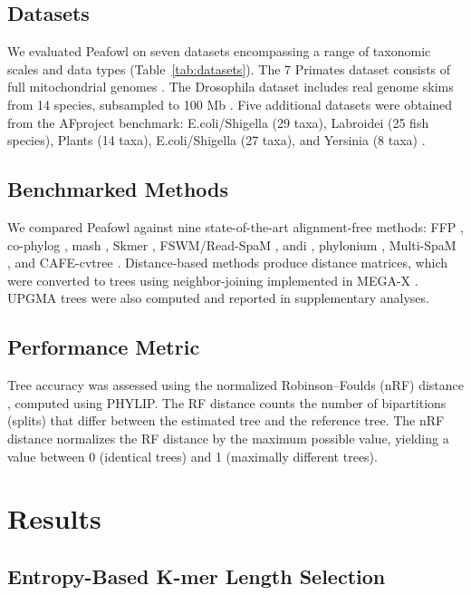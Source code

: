\documentclass[12pt]{article}
\begin{document}
\subsection{Datasets}

We evaluated Peafowl on seven datasets encompassing a range of taxonomic scales and data types (Table~\ref{tab:datasets}). The 7 Primates dataset consists of full mitochondrial genomes \citep{chan2013}. The Drosophila dataset includes real genome skims from 14 species, subsampled to 100 Mb \citep{sarmashghi2019}. Five additional datasets were obtained from the AFproject benchmark: E.coli/Shigella (29 taxa), Labroidei (25 fish species), Plants (14 taxa), E.coli/Shigella (27 taxa), and Yersinia (8 taxa) \citep{yi2013, gupta2019, hatje2012, zielezinski2019}.

\subsection{Benchmarked Methods}

We compared Peafowl against nine state-of-the-art alignment-free methods: FFP \citep{sims2009a, sims2009b}, co-phylog \citep{yi2013}, mash \citep{ondov2016}, Skmer \citep{sarmashghi2019}, FSWM/Read-SpaM \citep{leimeister2017, lau2019}, andi \citep{haubold2015}, phylonium \citep{klotzl2020}, Multi-SpaM \citep{dencker2020}, and CAFE-cvtree \citep{lu2013}. Distance-based methods produce distance matrices, which were converted to trees using neighbor-joining implemented in MEGA-X \citep{kumar2018}. UPGMA trees were also computed and reported in supplementary analyses.

\subsection{Performance Metric}

Tree accuracy was assessed using the normalized Robinson--Foulds (nRF) distance \citep{robinson1981}, computed using PHYLIP. The RF distance counts the number of bipartitions (splits) that differ between the estimated tree and the reference tree. The nRF distance normalizes the RF distance by the maximum possible value, yielding a value between 0 (identical trees) and 1 (maximally different trees).

\section{Results}

\subsection{Entropy-Based K-mer Length Selection}
\end{document}

